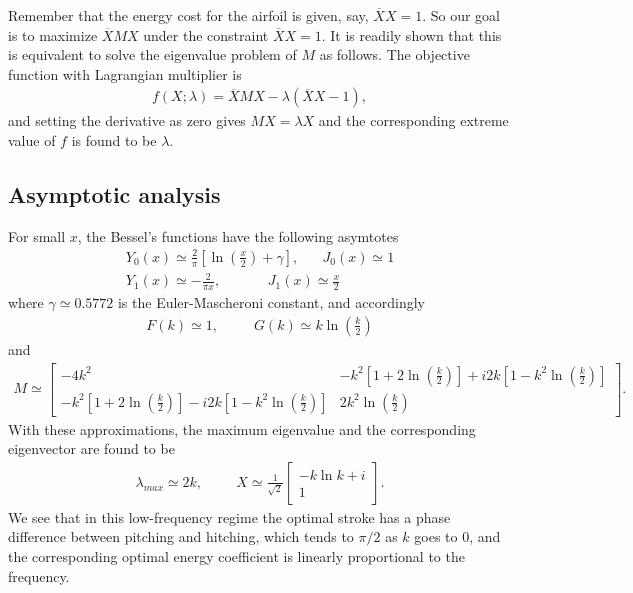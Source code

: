 Remember that the energy cost for the airfoil is given, say, $\overline{X} X = 1$.
So our goal is to maximize $\overline{X} M X$ under the constraint $\overline{X} X = 1$.
It is readily shown that this is equivalent to solve the eigenvalue problem of $M$ as follows.
The objective function with Lagrangian multiplier is 
\begin{align}
f(X; \lambda) = \overline{X} M X - \lambda (\overline{X} X - 1),
\end{align}
and setting the derivative as zero gives $MX = \lambda X$ and the corresponding extreme value of $f$ is found to be $\lambda$.

\subsection{Asymptotic analysis}

For small $x$, the Bessel's functions have the following asymtotes
\begin{align}
Y_0(x)  \simeq  \frac{2}{\pi}[\ln (\frac{x}{2}) + \gamma],   \hspace{20pt}  J_0(x) \simeq 1  \\
Y_1(x)  \simeq  -\frac{2}{\pi x},   \hspace{40pt}  J_1(x) \simeq \frac{x}{2}
\end{align}
where $\gamma \simeq 0.5772$ is the Euler-Mascheroni constant, and accordingly
\begin{align}
F(k) \simeq 1,  \hspace{30pt}   G(k) \simeq k \ln (\frac{k}{2})
\end{align}
and
\begin{align}
M \simeq \begin{bmatrix}   -4k^2   &  -k^2[1+ 2\ln (\frac{k}{2})] + i2k[1-k^2\ln (\frac{k}{2})]  \\
                        -k^2[1+ 2\ln (\frac{k}{2})] - i2k[1-k^2\ln (\frac{k}{2})] &   2k^2\ln (\frac{k}{2})  \end{bmatrix}.
\end{align}
With these approximations, the maximum eigenvalue and the corresponding eigenvector are found to be
\begin{align}
\lambda_{max} \simeq 2k,   \hspace{1cm}
X \simeq   \frac{1}{\sqrt{2}}
\begin{bmatrix} -k \ln k + i \\  1   \end{bmatrix}.
\end{align}
We see that in this low-frequency regime the optimal stroke has a phase difference between pitching and hitching, which tends to $\pi/2$ as $k$ goes to 0, and the corresponding optimal energy coefficient is linearly proportional to the frequency.


